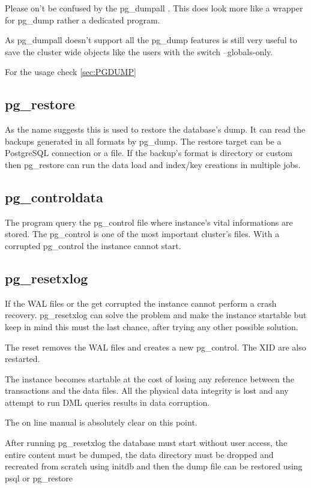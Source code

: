 Please on't be confused by the pg\_dumpall . This does look more like a wrapper for pg\_dump rather a dedicated program.

As pg\_dumpall doesn't support all the pg\_dump features is still very useful to save the cluster wide objects like the users with the switch --globals-only.

For the usage check \ref{sec:PGDUMP}


\subsection{pg\_restore}
As the name suggests this is used to restore the database's dump.
It can read the backups generated in all formats by pg\_dump. 
The restore target can be a PostgreSQL connection or a file. 
If the backup's format is directory or custom then pg\_restore can run the data load and
index/key creations in multiple jobs.

\subsection{pg\_controldata}\label{sub:PGCONTROLDATA}
The program query the pg\_control file where instance's vital informations are stored.
The pg\_control is one of the most important cluster's files.
With a corrupted pg\_control the instance cannot start. 

\subsection{pg\_resetxlog}

If the WAL files or the get corrupted the instance cannot perform a crash recovery.
pg\_resetxlog can solve the problem and make the instance startable but keep in mind 
this must the last chance, after trying any other possible solution.

The reset removes the WAL files and creates a new pg\_control.
The XID are also restarted. 

The instance becomes startable at the cost of losing any reference between the transactions 
and the data files. All the physical data integrity is lost and
any attempt to run DML queries results in data corruption. 

The on line manual is absolutely clear on this point.

After running pg\_resetxlog the database must start without user access, 
the entire content must be dumped, the data directory must be dropped and recreated 
from scratch using initdb and then the dump file can be restored using psql or pg\_restore


